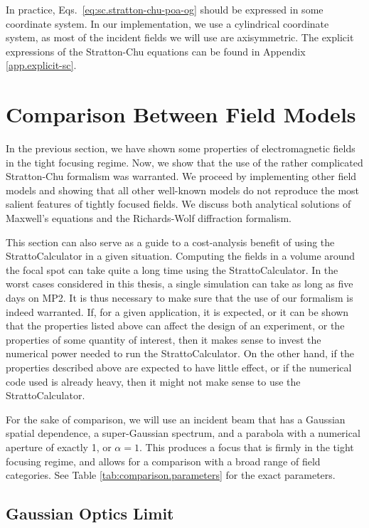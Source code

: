 \documentclass[11pt,SymmetricalJury]{inrsthesis/inrsthesis}
\begin{document}
In practice, Eqs.~\eqref{eq:sc.stratton-chu-poa-og} should be expressed in some
coordinate system. In our implementation, we use a cylindrical coordinate
system, as most of the incident fields we will use are axisymmetric. The
explicit expressions of the Stratton-Chu equations can be found in Appendix
\ref{app.explicit-sc}.

\section{Comparison Between Field Models}

In the previous section, we have shown some properties of electromagnetic fields
in the tight focusing regime. Now, we show that the use of the rather
complicated Stratton-Chu formalism was warranted. We proceed by implementing
other field models and showing that all other well-known models do not reproduce
the most salient features of tightly focused fields. We discuss both analytical
solutions of Maxwell's equations and the Richards-Wolf diffraction formalism.

This section can also serve as a guide to a cost-analysis benefit of using the
StrattoCalculator in a given situation. Computing the fields in a volume around
the focal spot can take quite a long time using the StrattoCalculator. In the
worst cases considered in this thesis, a single simulation can take as long as
five days on MP2. It is thus necessary to make sure that the use of our
formalism is indeed warranted. If, for a given application, it is expected, or
it can be shown that the properties listed above can affect the design of an
experiment, or the properties of some quantity of interest, then it makes sense
to invest the numerical power needed to run the StrattoCalculator. On the other
hand, if the properties described above are expected to have little effect, or
if the numerical code used is already heavy, then it might not make sense to use
the StrattoCalculator.

For the sake of comparison, we will use an incident beam that has a Gaussian
spatial dependence, a super-Gaussian spectrum, and a parabola with a numerical
aperture of exactly 1, or $\alpha=1$. This produces a focus that is firmly in
the tight focusing regime, and allows for a comparison with a broad range of
field categories. See Table \ref{tab:comparison.parameters} for the exact
parameters.

\subsection{Gaussian Optics Limit}
\end{document}
